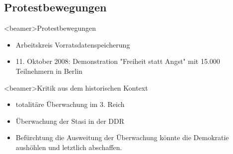       \subsection{Protestbewegungen}
    \begin{frame}<beamer>{Protestbewegungen}
       \begin{itemize}
        \item Arbeitskreis Vorratsdatenspeicherung
        \item 11. Oktober 2008: Demonstration "Freiheit statt Angst" mit 15.000 Teilnehmern in Berlin
      \end{itemize}
    \end{frame}
        \begin{frame}<beamer>{Kritik aus dem historischen Kontext}
       \begin{itemize}
        \item totalitäre Überwachung im 3. Reich
        \item Überwachung der Stasi in der DDR
        \item Befürchtung die Ausweitung der Überwachung könnte die Demokratie aushöhlen und letztlich abschaffen.
      \end{itemize}
    \end{frame}
    


    
    


